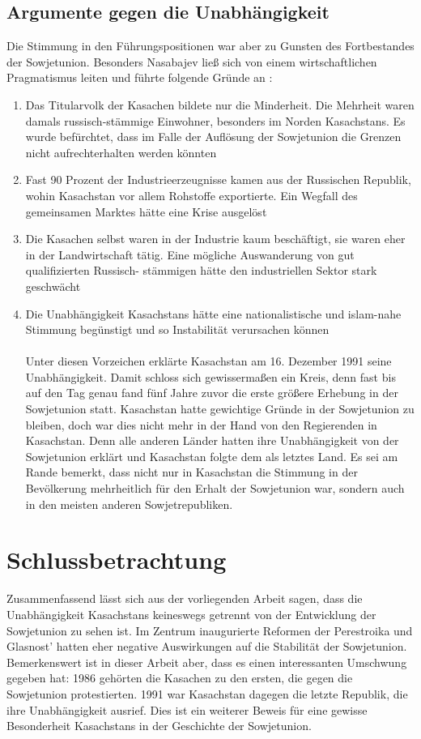 \documentclass[12pt,headsepline,a4paper]{scrartcl}
\begin{document}
\subsection{Argumente gegen die Unabhängigkeit}
Die Stimmung in den Führungspositionen war aber zu Gunsten des Fortbestandes der
Sowjetunion. Besonders Nasabajev ließ sich von einem wirtschaftlichen Pragmatismus
leiten und führte folgende Gründe an \autocite[62]{trut1994}:
\begin{enumerate}
 \item Das Titularvolk der Kasachen bildete nur die Minderheit. Die Mehrheit waren
damals russisch-stämmige Einwohner, besonders im Norden Kasachstans. Es wurde
befürchtet, dass im Falle der Auflösung der Sowjetunion die Grenzen nicht
aufrechterhalten werden könnten

\item Fast 90 Prozent der Industrieerzeugnisse kamen aus der Russischen Republik,
wohin Kasachstan vor allem Rohstoffe exportierte. Ein Wegfall des gemeinsamen
Marktes hätte eine Krise ausgelöst
\item Die Kasachen selbst waren in der Industrie kaum beschäftigt, sie waren eher in
der Landwirtschaft tätig. Eine mögliche Auswanderung von gut qualifizierten Russisch-
stämmigen hätte den industriellen Sektor stark geschwächt
\item Die Unabhängigkeit Kasachstans hätte eine nationalistische und islam-nahe
Stimmung begünstigt und so Instabilität verursachen können
\\
\\
Unter diesen Vorzeichen erklärte Kasachstan am 16. Dezember 1991 seine
Unabhängigkeit. Damit schloss sich gewissermaßen ein Kreis, denn fast bis auf den Tag
genau fand fünf Jahre zuvor die erste größere Erhebung in der Sowjetunion statt.
Kasachstan hatte gewichtige Gründe in der Sowjetunion zu bleiben, doch war dies nicht
mehr in der Hand von den Regierenden in Kasachstan. Denn alle anderen Länder hatten
ihre Unabhängigkeit von der Sowjetunion erklärt und Kasachstan folgte dem als letztes
Land. Es sei am Rande bemerkt, dass nicht nur in Kasachstan die Stimmung in der
Bevölkerung mehrheitlich für den Erhalt der Sowjetunion war, sondern auch in den
meisten anderen Sowjetrepubliken.

\end{enumerate}
\section*{Schlussbetrachtung}
Zusammenfassend lässt sich aus der vorliegenden Arbeit sagen, dass die
Unabhängigkeit
Kasachstans
keineswegs
getrennt
von
der
Entwicklung
der
Sowjetunion zu sehen ist. Im Zentrum inaugurierte Reformen der Perestroika und
Glasnost' hatten eher negative Auswirkungen auf die Stabilität der Sowjetunion.
Bemerkenswert ist in dieser Arbeit aber, dass es einen interessanten Umschwung
gegeben hat: 1986 gehörten die Kasachen zu den ersten, die gegen die Sowjetunion
protestierten. 1991 war Kasachstan dagegen die letzte Republik, die ihre
Unabhängigkeit ausrief. Dies ist ein weiterer Beweis für eine gewisse Besonderheit
Kasachstans in der Geschichte der Sowjetunion.
\newpage

%
\printbibliography
\end{document}
